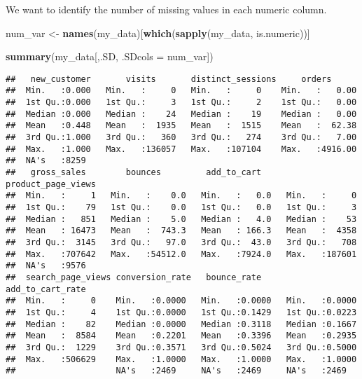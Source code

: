 \documentclass[]{article}
\newenvironment{Shaded}{\begin{snugshade}}{\end{snugshade}}
\newcommand{\KeywordTok}[1]{\textcolor[rgb]{0.13,0.29,0.53}{\textbf{{#1}}}}
\newcommand{\DataTypeTok}[1]{\textcolor[rgb]{0.13,0.29,0.53}{{#1}}}
\newcommand{\StringTok}[1]{\textcolor[rgb]{0.31,0.60,0.02}{{#1}}}
\newcommand{\NormalTok}[1]{{#1}}
\begin{document}
\newline
\newline

We want to identify the number of missing values in each numeric column.

\begin{Shaded}
\begin{Highlighting}[]
\NormalTok{num_var <-}\StringTok{ }\KeywordTok{names}\NormalTok{(my_data)[}\KeywordTok{which}\NormalTok{(}\KeywordTok{sapply}\NormalTok{(my_data, is.numeric))]}

\KeywordTok{summary}\NormalTok{(my_data[,.SD, }\DataTypeTok{.SDcols =} \NormalTok{num_var])}
\end{Highlighting}
\end{Shaded}

\begin{verbatim}
##   new_customer       visits       distinct_sessions     orders       
##  Min.   :0.000   Min.   :     0   Min.   :     0    Min.   :   0.00  
##  1st Qu.:0.000   1st Qu.:     3   1st Qu.:     2    1st Qu.:   0.00  
##  Median :0.000   Median :    24   Median :    19    Median :   0.00  
##  Mean   :0.448   Mean   :  1935   Mean   :  1515    Mean   :  62.38  
##  3rd Qu.:1.000   3rd Qu.:   360   3rd Qu.:   274    3rd Qu.:   7.00  
##  Max.   :1.000   Max.   :136057   Max.   :107104    Max.   :4916.00  
##  NA's   :8259                                                        
##   gross_sales        bounces         add_to_cart     product_page_views
##  Min.   :     1   Min.   :    0.0   Min.   :   0.0   Min.   :     0    
##  1st Qu.:    79   1st Qu.:    0.0   1st Qu.:   0.0   1st Qu.:     3    
##  Median :   851   Median :    5.0   Median :   4.0   Median :    53    
##  Mean   : 16473   Mean   :  743.3   Mean   : 166.3   Mean   :  4358    
##  3rd Qu.:  3145   3rd Qu.:   97.0   3rd Qu.:  43.0   3rd Qu.:   708    
##  Max.   :707642   Max.   :54512.0   Max.   :7924.0   Max.   :187601    
##  NA's   :9576                                                          
##  search_page_views conversion_rate   bounce_rate     add_to_cart_rate
##  Min.   :     0    Min.   :0.0000   Min.   :0.0000   Min.   :0.0000  
##  1st Qu.:     4    1st Qu.:0.0000   1st Qu.:0.1429   1st Qu.:0.0223  
##  Median :    82    Median :0.0000   Median :0.3118   Median :0.1667  
##  Mean   :  8584    Mean   :0.2201   Mean   :0.3396   Mean   :0.2935  
##  3rd Qu.:  1229    3rd Qu.:0.3571   3rd Qu.:0.5024   3rd Qu.:0.5000  
##  Max.   :506629    Max.   :1.0000   Max.   :1.0000   Max.   :1.0000  
##                    NA's   :2469     NA's   :2469     NA's   :2469
\end{verbatim}
\end{document}
